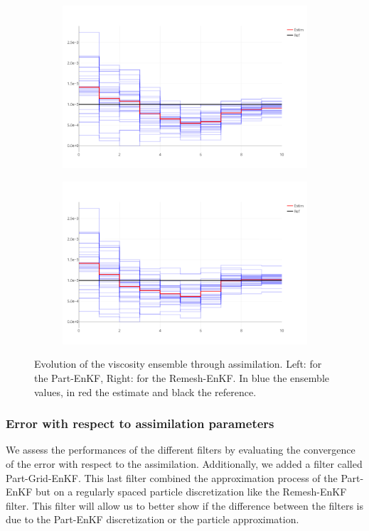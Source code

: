 \begin{figure}[htbp]
	\centering
	\begin{subfigure}{0.49\linewidth}
		\includegraphics*[width=\linewidth]{images/app2d/visc_ppf.png}
	\end{subfigure}
	\begin{subfigure}{0.49\linewidth}
		\includegraphics*[width=\linewidth]{images/app2d/visc_rmf.png}
	\end{subfigure}
	\caption{Evolution of the viscosity ensemble through assimilation. Left: for the Part-EnKF, Right: for the Remesh-EnKF. In blue the ensemble values, in red the estimate and black the reference.}
	\label{fig:visc_time}
\end{figure}

\subsubsection{Error with respect to assimilation parameters}
We assess the performances of the different filters by evaluating the convergence of the error with respect to the assimilation. Additionally, we added a filter called Part-Grid-EnKF. This last filter combined the approximation process of the Part-EnKF but on a regularly spaced particle discretization like the Remesh-EnKF filter. This filter will allow us to better show if the difference between the filters is due to the Part-EnKF discretization or the particle approximation.

